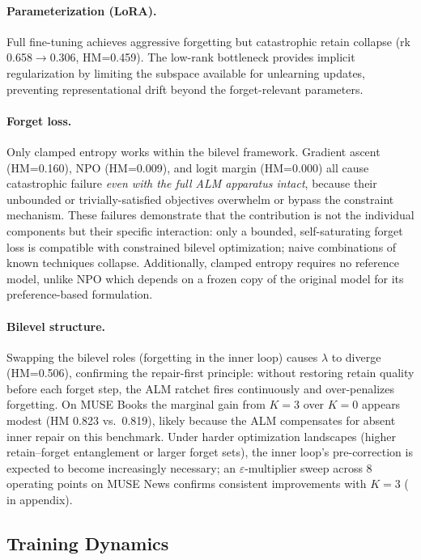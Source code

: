 \paragraph{Parameterization (LoRA).} Full fine-tuning achieves aggressive forgetting but catastrophic retain collapse (rk 0.658$\to$0.306, HM=0.459).
The low-rank bottleneck provides implicit regularization by limiting the subspace available for unlearning updates, preventing representational drift beyond the forget-relevant parameters.

\paragraph{Forget loss.} Only clamped entropy works within the bilevel framework.
Gradient ascent (HM=0.160), NPO (HM=0.009), and logit margin (HM=0.000) all cause catastrophic failure \emph{even with the full ALM apparatus intact}, because their unbounded or trivially-satisfied objectives overwhelm or bypass the constraint mechanism.
These failures demonstrate that the contribution is not the individual components but their specific interaction: only a bounded, self-saturating forget loss is compatible with constrained bilevel optimization; naive combinations of known techniques collapse.
Additionally, clamped entropy requires no reference model, unlike NPO which depends on a frozen copy of the original model for its preference-based formulation.

\paragraph{Bilevel structure.} Swapping the bilevel roles (forgetting in the inner loop) causes $\lambda$ to diverge (HM=0.506), confirming the repair-first principle: without restoring retain quality before each forget step, the ALM ratchet fires continuously and over-penalizes forgetting.
On MUSE Books the marginal gain from $K\!=\!3$ over $K\!=\!0$ appears modest (HM 0.823 vs.\ 0.819), likely because the ALM compensates for absent inner repair on this benchmark.
Under harder optimization landscapes (higher retain--forget entanglement or larger forget sets), the inner loop's pre-correction is expected to become increasingly necessary; an $\varepsilon$-multiplier sweep across 8 operating points on MUSE News confirms consistent improvements with $K\!=\!3$ ( in appendix).

\subsection{Training Dynamics}
\label{sec:dynamics}


